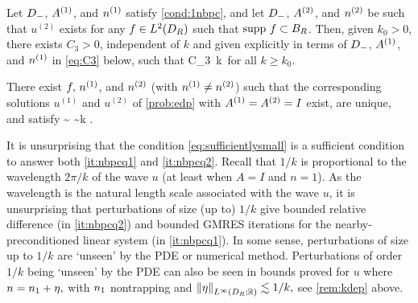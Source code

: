 
\begin{theorem}\label{thm:2}
Let $D_{-}$, ${A}^{(1)}$, and ${n}^{(1)}$ satisfy \cref{cond:1nbpc}, and let $D_{-}$, ${A}^{(2)}$, and ${n}^{(2)}$ be such that $u^{(2)}$ exists
for any $f\in L^2(D_{R})$ such that $\operatorname{supp} \, f \subset B_{R}$. 
Then, given $k_0>0$, there exists $C_3>0$, independent of $k$ and given explicitly in terms of $D_{-}$, ${A}^{(1)}$, and ${n}^{(1)}$ in \cref{eq:C3} below, such that
\beq\label{eq:PDEbound}
\leq C_3 \,k\, \max\set{\NLiDRRRdtd{\Aso-\Ast}\,,\, \NLiDRRR{\nso-\nst}}
\eeq
for all $k\geq k_0$. 
\end{theorem}

\ble[Sharpness of the bound \cref{eq:PDEbound} when $\Aso = \Ast= I$]\label{lem:sharp}
There exist $f, \,{n}^{(1)}$, and ${n}^{(2)}$ (with ${n}^{(1)}\neq {n}^{(2)}$) such that 
the corresponding solutions $u^{(1)}$ and $u^{(2)}$ of \cref{prob:edp} with $\Aso = \Ast= I$ exist, are unique, and satisfy
\beq\label{eq:sharp1}
\sim 
{}\sim k \NLiDRRR{\nso-\nst}.
\eeq
\ele

\label{rem:physical1k}
It is unsurprising that the condition \cref{eq:sufficientlysmall} is a sufficient condition to answer both \cref{it:nbpcq1} and \cref{it:nbpcq2}. Recall that $1/k$ is proportional to the wavelength $2\pi/k$ of the wave $u$ (at least when $A=I$ and $n=1$). As the wavelength is the natural length scale associated with the wave $u$, it is unsurprising that perturbations of size (up to) $1/k$ give bounded relative difference (in \cref{it:nbpcq2}) and bounded GMRES iterations for the nearby-preconditioned linear system (in \cref{it:nbpcq1}). In some sense, perturbations of size up to $1/k$ are `unseen' by the PDE or numerical method. Perturbations of order $1/k$ being `unseen' by the PDE can also be seen in bounds proved for $u$ where $n = n_{1} + \eta,$ with $n_{1}$ nontrapping and $\NLiDRRR{\eta} \lesssim 1/k,$ see \cref{rem:kdep} above.
\ere


